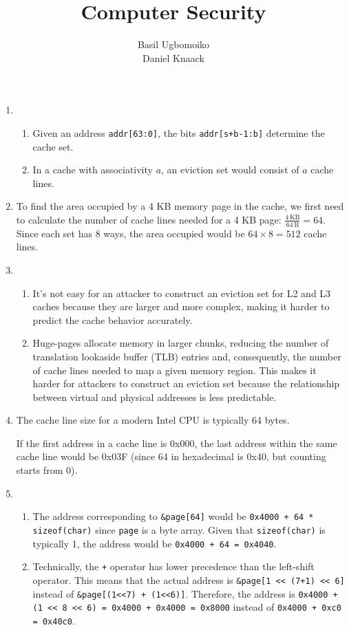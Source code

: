 \documentclass[sheet=2, english]{dexercise}
\title{Computer Security}
\author{Basil Ugbomoiko\\Daniel Knaack}
\begin{document}
\task[Caches]

\begin{enumerate}
  \item
    \begin{enumerate}
      \item
        Given an address \texttt{addr[63:0]}, the bits \texttt{addr[s+b-1:b]}
        determine the cache set.
      \item
        In a cache with associativity $a$, an eviction set would consist of $a$
        cache lines.
    \end{enumerate}
  \item
    To find the area occupied by a 4 KB memory page in the cache, we first need
    to calculate the number of cache lines needed for a 4 KB page: $\frac{4\,
    \text{KB}}{64\, \text{B}} = 64$.
    Since each set has 8 ways, the area occupied would be $64 \times 8 = 512$
    cache lines.
  \item
    \begin{enumerate}
      \item
        It's not easy for an attacker to construct an eviction set for L2 and
        L3 caches because they are larger and more complex, making it harder to
        predict the cache behavior accurately.
      \item
        Huge-pages allocate memory in larger chunks, reducing the number of
        translation lookaside buffer (TLB) entries and, consequently, the
        number of cache lines needed to map a given memory region.
        This makes it harder for attackers to construct an eviction set because
        the relationship between virtual and physical addresses is less
        predictable.
    \end{enumerate}
  \item
    The cache line size for a modern Intel CPU is typically 64 bytes.

    If the first address in a cache line is 0x000, the last address within the
    same cache line would be 0x03F (since 64 in hexadecimal is 0x40, but
    counting starts from 0).
  \item
    \begin{enumerate}
      \item
        The address corresponding to \texttt{\&page[64]} would be
        \texttt{0x4000 + 64 * sizeof(char)} since \texttt{page} is a byte
        array. Given that \texttt{sizeof(char)} is typically 1, the address
        would be \texttt{0x4000 + 64 = 0x4040}.
      \item
        Technically, the \texttt{+} operator has lower precedence than the
        left-shift operator.
        This means that the actual address is \texttt{\&page[1~<<~(7+1)~<<~6]}
        instead of \texttt{\&page[(1<<7)~+~(1<<6)]}.
        Therefore, the address is \texttt{0x4000 + (1 << 8 << 6) = 0x4000 +
        0x4000 = 0x8000} instead of \texttt{0x4000 + 0xc0 = 0x40c0}.


\end{enumerate}
\end{enumerate}
\end{document}
